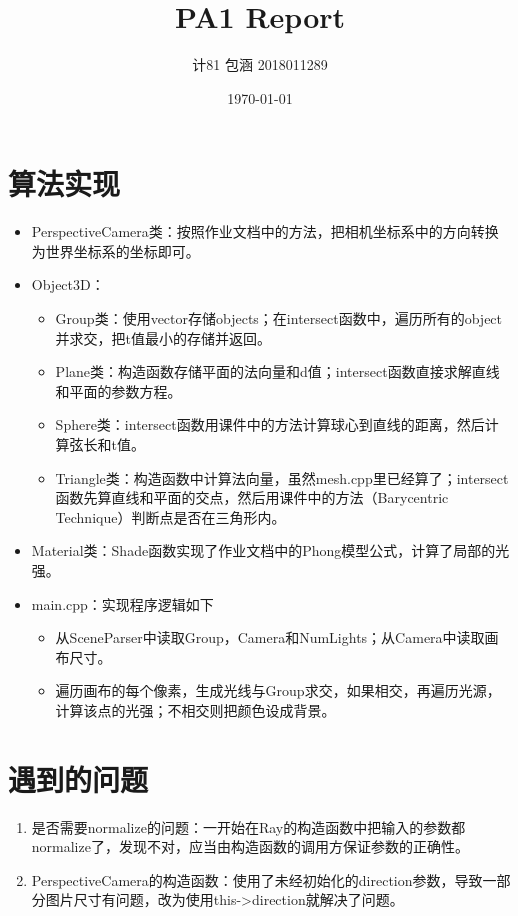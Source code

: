 \documentclass{article}
\title{PA1 Report}
\author{
  计81 包涵 2018011289
}
\date{\today}
\begin{document}
\maketitle

\section{算法实现}
\begin{itemize}
    \item PerspectiveCamera类：按照作业文档中的方法，把相机坐标系中的方向转换为世界坐标系的坐标即可。
    \item Object3D： \begin{itemize}
        \item Group类：使用vector存储objects；在intersect函数中，遍历所有的object并求交，把t值最小的存储并返回。
        \item Plane类：构造函数存储平面的法向量和d值；intersect函数直接求解直线和平面的参数方程。
        \item Sphere类：intersect函数用课件中的方法计算球心到直线的距离，然后计算弦长和t值。
        \item Triangle类：构造函数中计算法向量，虽然mesh.cpp里已经算了；intersect函数先算直线和平面的交点，然后用课件中的方法（Barycentric Technique）判断点是否在三角形内。
    \end{itemize}
    \item Material类：Shade函数实现了作业文档中的Phong模型公式，计算了局部的光强。
    \item main.cpp：实现程序逻辑如下 \begin{itemize}
        \item 从SceneParser中读取Group，Camera和NumLights；从Camera中读取画布尺寸。
        \item 遍历画布的每个像素，生成光线与Group求交，如果相交，再遍历光源，计算该点的光强；不相交则把颜色设成背景。
    \end{itemize}
\end{itemize}

\section{遇到的问题}
\begin{enumerate}
    \item 是否需要normalize的问题：一开始在Ray的构造函数中把输入的参数都normalize了，发现不对，应当由构造函数的调用方保证参数的正确性。
    \item PerspectiveCamera的构造函数：使用了未经初始化的direction参数，导致一部分图片尺寸有问题，改为使用this->direction就解决了问题。
\end{enumerate}
\end{document}
